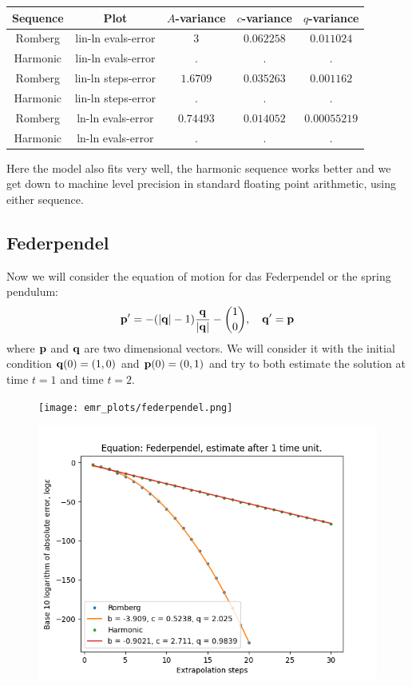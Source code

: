 \begin{table}[H]
    \centering
    \begin{tabular}{c|c||c|c|c}
Sequence & Plot & \(A\)-variance & \(c\)-variance & \(q\)-variance\\\hline
Romberg & lin-ln evals-error & \(3\) & \(0.062258\) & \(0.011024\) \\
Harmonic & lin-ln evals-error & . & . & . \\
Romberg & lin-ln steps-error & \(1.6709\) & \(0.035263\) & \(0.001162\) \\
Harmonic & lin-ln steps-error & . & . & . \\
Romberg & ln-ln evals-error & \(0.74493\) & \(0.014052\) & \(0.00055219\) \\
Harmonic & ln-ln evals-error & . & . & . \\
    \end{tabular}
    \label{tab:my_label}
\end{table}

Here the model also fits very well, the harmonic sequence works better and we get down to machine level precision in standard floating point arithmetic, using either sequence.

\subsection{Federpendel}

Now we will consider the equation of motion for das Federpendel or the spring pendulum:
\[
\mathbf{p}' = -(|\mathbf{q}| - 1)\frac{\mathbf{q}}{|\mathbf{q}|} - {1\choose 0}, \quad \mathbf{q}' = \mathbf{p}
\]
where \(\mathbf{p}\) and \(\mathbf{q}\) are two dimensional vectors. We will consider it with the initial condition \(\mathbf{q}(0) = (1,0)\) and \(\mathbf{p}(0) = (0,1)\) and try to both estimate the solution at time \(t = 1\) and time \(t = 2\).

\begin{figure}[H]
\centering
\begin{minipage}{0.45\textwidth}
\centering
\texttt{[image: emr\_plots/federpendel.png]}
\end{minipage}
\begin{minipage}{0.45\textwidth}
\centering
\includegraphics[scale=0.45]{emr_plots/federpendel_1_hp_steps.png}
\end{minipage}
\end{figure}

